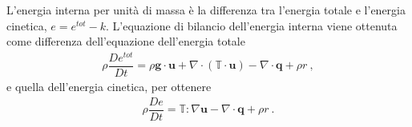 \documentclass[letterpaper,10pt,english]{jupyterBook}
\begin{document}
\sphinxAtStartPar
{} L’energia interna per unità di massa è la differenza tra l’energia totale e l’energia cinetica, \(e = e^{tot} - k\). L’equazione di bilancio dell’energia interna viene ottenuta come differenza dell’equazione dell’energia totale
\begin{equation*}
\begin{split}\rho \dfrac{D e^{tot}}{Dt} = \rho \mathbf{g} \cdot \mathbf{u} + \nabla \cdot (\mathbb{T} \cdot \mathbf{u}) - \nabla \cdot \mathbf{q} + \rho r \ ,\end{split}
\end{equation*}
\sphinxAtStartPar
e quella dell’energia cinetica, per ottenere
\begin{equation*}
\begin{split}\rho \dfrac{D e}{D t} = \mathbb{T} : \nabla \mathbf{u} - \nabla \cdot \mathbf{q} + \rho r \ . \end{split}
\end{equation*}
\sphinxAtStartPar
{}
\end{document}
